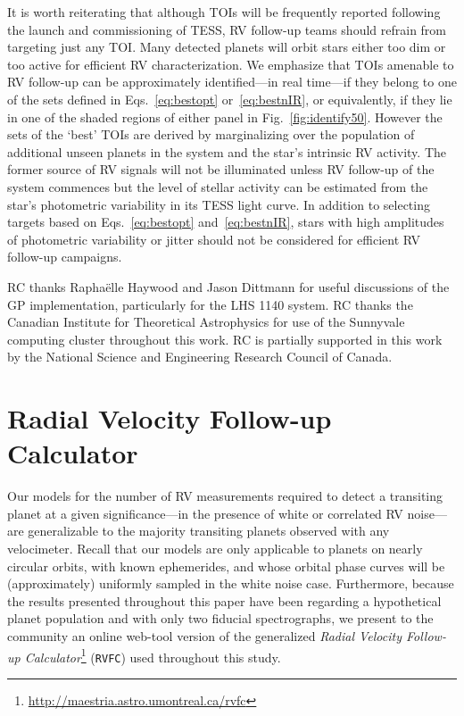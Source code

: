 It is worth reiterating that although TOIs will be frequently reported following the launch and
commissioning of TESS, RV follow-up teams should refrain from targeting just any TOI. Many detected
planets will orbit stars either too dim or too active for efficient RV characterization. We emphasize
that TOIs amenable to RV follow-up can be approximately identified---in real time---if they belong
to one of the sets defined in Eqs.~\ref{eq:bestopt} or~\ref{eq:bestnIR}, or equivalently, if they lie
in one of the shaded regions of either panel in Fig.~\ref{fig:identify50}. However the sets of the
`best' TOIs are derived by marginalizing over the population of additional unseen planets in the
system and the star's intrinsic RV activity. The former source of RV signals will not be illuminated
unless RV follow-up of the system commences but the level of stellar activity can be estimated
from the star's photometric variability in its TESS light curve. In addition to selecting targets
based on Eqs.~\ref{eq:bestopt} and~\ref{eq:bestnIR}, stars with high amplitudes of photometric
variability or jitter should not be considered for efficient RV follow-up campaigns.

\acknowledgements
RC thanks Rapha\"elle Haywood and Jason Dittmann for useful discussions of the GP implementation,
particularly for the LHS 1140 system. RC thanks the Canadian Institute for Theoretical Astrophysics
for use of the Sunnyvale computing cluster throughout this work.
RC is partially supported in this work by the National Science and Engineering Research
Council of Canada.


\appendix
\section{Radial Velocity Follow-up Calculator} \label{app:rvfc}
Our models for the number of RV measurements \nrv{} required to detect a transiting planet
at a given
significance---in the presence of white or correlated RV noise---are generalizable to the majority
transiting planets observed with any velocimeter. Recall that our models are only applicable to
planets on nearly circular orbits, with known ephemerides, and 
whose orbital phase curves will be (approximately) uniformly sampled in the white noise case.
Furthermore, because the results presented throughout this paper
have been regarding a hypothetical planet population and with only two fiducial spectrographs,
we present to the community an online web-tool version of the generalized
\emph{Radial Velocity Follow-up Calculator}\footnote{\url{http://maestria.astro.umontreal.ca/rvfc}}
(\texttt{RVFC}) used throughout this study.

